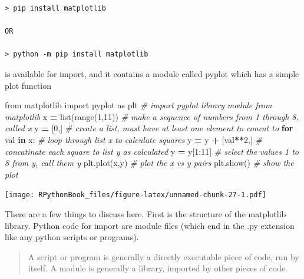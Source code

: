 \documentclass[]{book}
\newenvironment{Shaded}{\begin{snugshade}}{\end{snugshade}}
\newcommand{\KeywordTok}[1]{\textcolor[rgb]{0.13,0.29,0.53}{\textbf{#1}}}
\newcommand{\DecValTok}[1]{\textcolor[rgb]{0.00,0.00,0.81}{#1}}
\newcommand{\ImportTok}[1]{#1}
\newcommand{\CommentTok}[1]{\textcolor[rgb]{0.56,0.35,0.01}{\textit{#1}}}
\newcommand{\ControlFlowTok}[1]{\textcolor[rgb]{0.13,0.29,0.53}{\textbf{#1}}}
\newcommand{\OperatorTok}[1]{\textcolor[rgb]{0.81,0.36,0.00}{\textbf{#1}}}
\newcommand{\BuiltInTok}[1]{#1}
\newcommand{\NormalTok}[1]{#1}
\theoremstyle{definition}
\theoremstyle{definition}
\theoremstyle{definition}
\theoremstyle{remark}
\begin{document}
\begin{verbatim}
> pip install matplotlib

OR

> python -m pip install matplotlib
\end{verbatim}

is available for import, and it contains a module called pyplot which
has a simple plot function

\begin{Shaded}
\begin{Highlighting}[]
\ImportTok{from}\NormalTok{ matplotlib }\ImportTok{import}\NormalTok{ pyplot }\ImportTok{as}\NormalTok{ plt  }\CommentTok{# import pyplot library module from matplotlib}
\NormalTok{x }\OperatorTok{=} \BuiltInTok{list}\NormalTok{(}\BuiltInTok{range}\NormalTok{(}\DecValTok{1}\NormalTok{,}\DecValTok{11}\NormalTok{))                  }\CommentTok{# make a sequence of numbers from 1 through 8, called x}
\NormalTok{y }\OperatorTok{=}\NormalTok{ [}\DecValTok{0}\NormalTok{,]                              }\CommentTok{# create a list, must have at least one element to concat to}
\ControlFlowTok{for}\NormalTok{ val }\KeywordTok{in}\NormalTok{ x:                         }\CommentTok{# loop through list x to calculate squares}
\NormalTok{    y }\OperatorTok{=}\NormalTok{ y }\OperatorTok{+}\NormalTok{ [val}\OperatorTok{**}\DecValTok{2}\NormalTok{,]                 }\CommentTok{# concatinate each square to list y as calculated}
\NormalTok{y }\OperatorTok{=}\NormalTok{ y[}\DecValTok{1}\NormalTok{:}\DecValTok{11}\NormalTok{]                            }\CommentTok{# select the values 1 to 8 from y, call them y}
\NormalTok{plt.plot(x,y)                         }\CommentTok{# plot the x vs y pairs}
\NormalTok{plt.show()                            }\CommentTok{# show the plot}
\end{Highlighting}
\end{Shaded}

\texttt{[image: RPythonBook\_files/figure-latex/unnamed-chunk-27-1.pdf]}

There are a few things to discuss here. First is the structure of the
matplotlib library. Python code for import are module files (which end
in the .py extension like any python scripts or programs).

\begin{quote}
A script or program is generally a directly executable piece of code,
run by itself. A module is generally a library, imported by other pieces
of code.
\end{quote}
\end{document}
